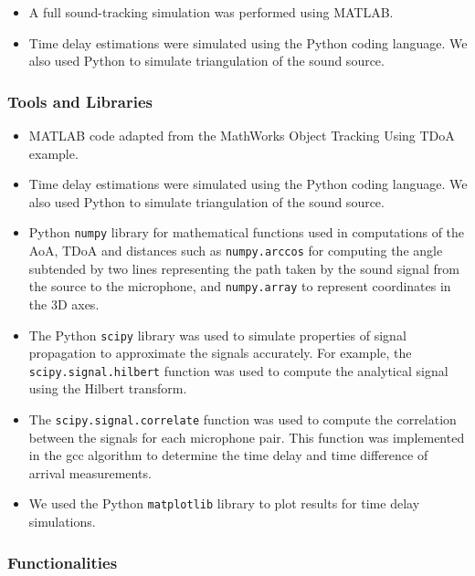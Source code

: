\documentclass[a4paper,11pt]{article}
\begin{document}
\begin{itemize}
	\item
	A full sound-tracking simulation was performed using MATLAB. 
	\item 
	Time delay estimations were simulated using the Python coding language. We also used Python to simulate triangulation of the sound source.  
\end{itemize}

\subsubsection{Tools and Libraries}

\begin{itemize}
	\item
	MATLAB code adapted from the MathWorks Object Tracking Using TDoA example.
	\item 
	Time delay estimations were simulated using the Python coding language. We also used Python to simulate triangulation of the sound source.
	\item 
	Python \texttt{numpy} library for mathematical functions used in computations of the AoA, TDoA and distances such as \texttt{numpy.arccos} for computing the angle subtended by two lines representing the path taken by the sound signal from the source to the microphone, and \texttt{numpy.array} to represent coordinates in the 3D axes.
	\item 
	The Python \texttt{scipy} library was used to simulate properties of signal propagation to approximate the signals accurately. For example, the \texttt{scipy.signal.hilbert} function was used to compute the analytical signal using the Hilbert transform.
	\item 
	The \texttt{scipy.signal.correlate} function was used to compute the correlation between the signals for each microphone pair. This function was implemented in the \gls{gcc} algorithm to determine the time delay and time difference of arrival measurements.
	\item 
	We used the Python \texttt{matplotlib} library to plot results for time delay simulations.
\end{itemize}

\subsubsection{Functionalities}
\end{document}
